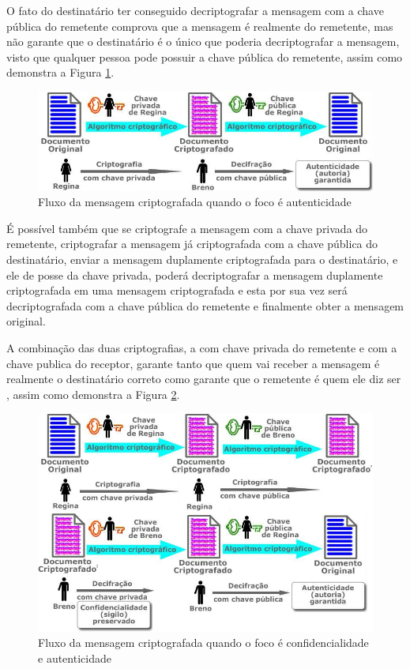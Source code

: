 O fato do destinatário ter conseguido decriptografar a mensagem com a chave pública do remetente comprova que a mensagem é realmente do remetente, mas não garante que o destinatário é o único que poderia decriptografar a mensagem, visto que qualquer pessoa pode possuir a chave pública do remetente, assim como demonstra a Figura \ref{fig:cripfocoauten}.

\begin{figure}[H]
    \centering
    \caption{Fluxo da mensagem criptografada quando o foco é autenticidade}
    \label{fig:cripfocoauten}
    \includegraphics[width=.8\linewidth]{Figuras/Autencidade.png}
\end{figure}

É possível também que se criptografe a mensagem com a chave privada do remetente, criptografar a mensagem já criptografada com a chave pública do destinatário, enviar a mensagem duplamente criptografada para o destinatário, e ele de posse da chave privada, poderá decriptografar a mensagem duplamente criptografada em uma mensagem criptografada e esta por sua vez será decriptografada com a chave pública do remetente e finalmente obter a mensagem original.

A combinação das duas criptografias, a com chave privada do remetente e com a chave publica do receptor, garante tanto que quem vai receber a mensagem é realmente o destinatário correto como garante que o remetente é quem ele diz ser \cite{stallings14}, assim como demonstra a Figura \ref{fig:cripfococonfieauten}.

\begin{figure}[H]
    \centering
    \caption{Fluxo da mensagem criptografada quando o foco é confidencialidade e autenticidade}
    \label{fig:cripfococonfieauten}
    \includegraphics[width=.8\linewidth]{Figuras/ConfidEAuten.png}
\end{figure}

